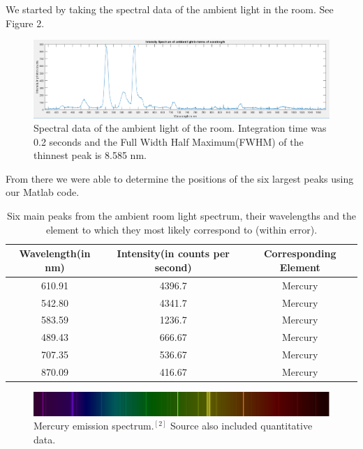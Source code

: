 \documentclass{article}
\begin{document}
We started by taking the spectral data of the ambient light in the room.  See Figure 2. 

\begin{figure}[H]
\includegraphics[scale=.5,center]{RoomSpec.PNG}
\caption{Spectral data of the ambient light of the room.  Integration time was 0.2 seconds and the Full Width Half Maximum(FWHM) of the thinnest peak is 8.585 nm.}
\end{figure}

From there we were able to determine the positions of the six largest peaks using our Matlab code.

\begin {table}[H]
\begin{center}
 \begin{tabular}{|c | c| c|} 
 \hline
 Wavelength(in nm) & Intensity(in counts per second)  & Corresponding Element\\ [1ex] 
 \hline\hline
 610.91 & 4396.7 & Mercury\\ 
 \hline
 542.80 & 4341.7 & Mercury\\
 \hline
 583.59 & 1236.7 & Mercury\\
 \hline
 489.43 & 666.67 & Mercury\\
 \hline
 707.35 & 536.67 & Mercury\\ 
 \hline
 870.09 & 416.67 & Mercury \\
 \hline
\end{tabular}
\end{center}
\caption {Six main peaks from the ambient room light spectrum, their wavelengths and the element to which they most likely correspond to (within error).} \label{tab:title}
\end{table}

\begin{figure}[H]
\includegraphics[scale=.5,center]{mercury.jpg}
\caption{Mercury emission spectrum.$^{[2]}$  Source also included quantitative data.}
\end{figure}
\end{document}
